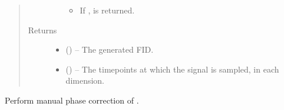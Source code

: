 \documentclass[letterpaper,10pt,english]{sphinxmanual}
\begin{document}
\begin{fulllineitems}
\begin{fulllineitems}
\begin{quote}
\begin{description}
\begin{itemize}
\begin{itemize}
\item {} 
\sphinxAtStartPar
If ,  is returned.

\end{itemize}


\end{itemize}

\item[{Returns}] \leavevmode
\sphinxAtStartPar
\begin{itemize}
\item {} 
\sphinxAtStartPar
{} () – The generated FID.

\item {} 
\sphinxAtStartPar
{} () – The time\sphinxhyphen{}points at which the signal is sampled, in each dimension.

\end{itemize}


\end{description}\end{quote}


\nopagebreak


\sphinxAtStartPar
{\hyperref[\detokenize{references/sig:nmrespy.sig.make_fid}]{}}



\end{fulllineitems}


\begin{fulllineitems}
\label{\detokenize{references/core:nmrespy.core.Estimator.manual_phase_data}}
\sphinxAtStartPar
Perform manual phase correction of .


\end{fulllineitems}
\end{fulllineitems}
\end{document}

